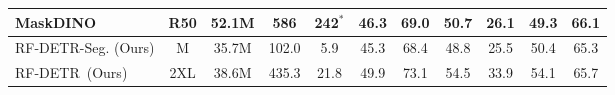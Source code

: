 \documentclass{article} %
\newcommand{\method}{RF-DETR}
\begin{document}
{\begin{table}[t]
{\begin{tabular}{|lcccccccccc|}
\multicolumn{1}{|l|}{MaskDINO \citep{li2023maskdino}}      & \multicolumn{1}{c|}{R50}     &   52.1M    &   586     & \multicolumn{1}{c|}{242$^*$}             &  46.3  &   69.0   &   50.7   &  26.1   &  49.3   &   66.1  \\ \hline
\multicolumn{1}{|l|}{\method-Seg. (Ours)}     & \multicolumn{1}{c|}{M}     &    35.7M      &    102.0    & \multicolumn{1}{c|}{5.9}             &  45.3  &   68.4   &  48.8    &   25.5  &   50.4  &  65.3   \\ \hline \hline
\multicolumn{1}{|l|}{\method \ (Ours)}     & \multicolumn{1}{c|}{2XL}     &   38.6M    &    435.3    & \multicolumn{1}{c|}{21.8}             &   49.9  &   73.1   &   54.5   &   33.9   &   54.1   &   65.7  \\ \hline


\end{tabular}
}
\end{table}
}
\end{document}
